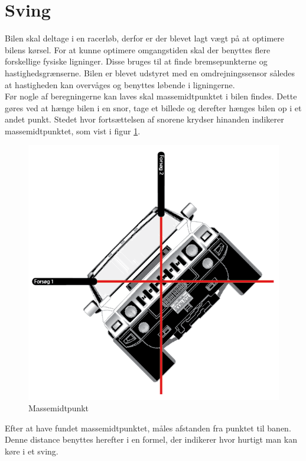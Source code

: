 \section{Sving}
\label{sving}
Bilen skal deltage i en racerløb, derfor er der blevet lagt vægt på at optimere bilens kørsel. 
For at kunne optimere omgangstiden skal der benyttes flere forskellige fysiske ligninger. Disse bruges til at finde bremsepunkterne og hastighedsgrænserne. Bilen er blevet udstyret med en omdrejningssensor således at hastigheden kan overvåges og benyttes løbende i ligningerne. \\

Før nogle af beregningerne kan laves skal massemidtpunktet i bilen findes. Dette gøres ved at hænge bilen i en snor, tage et billede og derefter hænges bilen op i et andet punkt. Stedet hvor fortsættelsen af snorene krydser hinanden indikerer massemidtpunktet, som vist i figur \ref{massemidtpunkt}. \\

\begin{figure}
\includegraphics[scale=0.35]{./Graphics/massemidtpunkt.png}
\caption{Massemidtpunkt}
\label{massemidtpunkt}
\end{figure}

Efter at have fundet massemidtpunktet, måles afstanden fra punktet til banen. Denne distance benyttes herefter i en formel, der indikerer hvor hurtigt man kan køre i et sving.  \\


